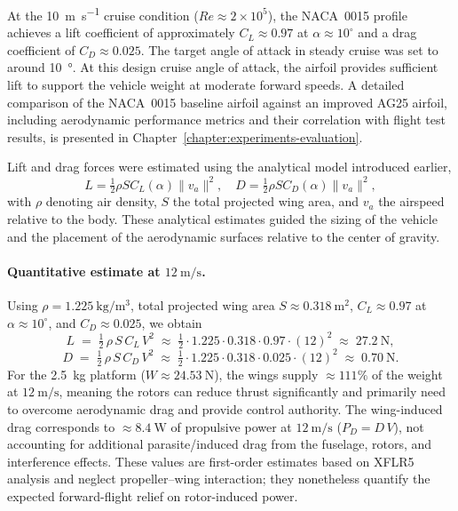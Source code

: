 At the \SI{10}{\meter\per\second} cruise condition (\(Re \approx 2 \times 10^5\)), the NACA~0015 profile achieves a lift coefficient of approximately \(C_L \approx 0.97\) at \(\alpha \approx 10^\circ\) and a drag coefficient of \(C_D \approx 0.025\).
The target angle of attack in steady cruise was set to around \SI{10}{\degree}.  
At this design cruise angle of attack, the airfoil provides sufficient lift to support the vehicle weight at moderate forward speeds.
A detailed comparison of the NACA~0015 baseline airfoil against an improved AG25 airfoil, including aerodynamic performance metrics and their correlation with flight test results, is presented in Chapter~\ref{chapter:experiments-evaluation}.

Lift and drag forces were estimated using the analytical model introduced earlier,
\[
L = \tfrac{1}{2} \rho S C_L(\alpha) \|v_a\|^2, \quad
D = \tfrac{1}{2} \rho S C_D(\alpha) \|v_a\|^2,
\]
with \(\rho\) denoting air density, \(S\) the total projected wing area, and \(v_a\) the airspeed relative to the body.  
These analytical estimates guided the sizing of the vehicle and the placement of the aerodynamic surfaces relative to the center of gravity.

\paragraph{Quantitative estimate at \(12~\mathrm{m/s}\).}
Using \(\rho=1.225~\mathrm{kg/m^3}\), total projected wing area \(S \approx 0.318~\mathrm{m^2}\), \(C_L \approx 0.97\) at \(\alpha \approx 10^\circ\), and \(C_D \approx 0.025\), we obtain
\[
L \;=\; \tfrac{1}{2}\,\rho\,S\,C_L\,V^2
\;\approx\; \tfrac{1}{2}\cdot 1.225 \cdot 0.318 \cdot 0.97 \cdot (12)^2
\;\approx\; 27.2~\mathrm{N},
\]
\[
D \;=\; \tfrac{1}{2}\,\rho\,S\,C_D\,V^2
\;\approx\; \tfrac{1}{2}\cdot 1.225 \cdot 0.318 \cdot 0.025 \cdot (12)^2
\;\approx\; 0.70~\mathrm{N}.
\]
For the \SI{2.5}{kg} platform (\(W \approx 24.53~\mathrm{N}\)), the wings supply \(\approx 111\%\) of the weight at \(12~\mathrm{m/s}\), meaning the rotors can reduce thrust significantly and primarily need to overcome aerodynamic drag and provide control authority. The wing-induced drag corresponds to \(\approx 8.4~\mathrm{W}\) of propulsive power at \(12~\mathrm{m/s}\) (\(P_D = D\,V\)), not accounting for additional parasite/induced drag from the fuselage, rotors, and interference effects. These values are first-order estimates based on XFLR5 analysis and neglect propeller–wing interaction; they nonetheless quantify the expected forward-flight relief on rotor-induced power.

